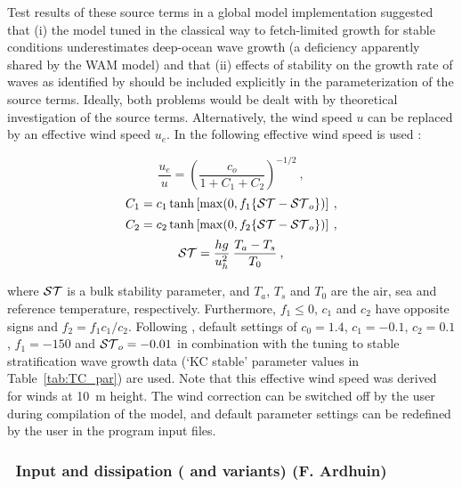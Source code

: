 Test results of these source terms in a global model implementation
\citep{tol:OMB02a} suggested that (i) the model tuned in the classical way to
fetch-limited growth for stable conditions underestimates deep-ocean wave
growth (a deficiency apparently shared by the WAM model) and that (ii) effects
of stability on the growth rate of waves as identified by
\cite{art:KC92,ibk:KC94} should be included explicitly in the parameterization
of the source terms.  Ideally, both problems would be dealt with by
theoretical investigation of the source terms. Alternatively, the wind speed
$u$ can be replaced by an effective wind speed $u_e$. In \cite{tol:OMB02a} the
following effective wind speed is used :


\begin{equation}
\frac{u_e}{u} = \left ( \frac{c_o}{1 + C_1 + C_2} \right )^{-1/2}
\: , \label{eq:scor} \end{equation} \begin{equation}
C_1 = c_1 \tanh \left [ \max ( 0 , f_1 \{ {\cal ST} - {\cal ST}_o \} ) \right ]
\: , \label{eq:c1} \end{equation} \begin{equation}
C_2 = c_2 \tanh \left [ \max ( 0 , f_2 \{ {\cal ST} - {\cal ST}_o \} ) \right ]
\: , \label{eq:c2} \end{equation} \begin{equation}
{\cal ST} = \frac{h g}{u_h^2} \: \frac{T_a - T_s}{T_0}
\: , \label{eq:stab} \end{equation}

\noindent
where ${\cal ST}$ is a bulk stability parameter, and $T_a$, $T_s$ and $T_0$ are the
air, sea and reference temperature, respectively. Furthermore, $f_1 \leq 0$,
$c_1$ and $c_2$ have opposite signs and $f_2 = f_1 c_1 / c_2$. Following
\cite{tol:OMB02a}, default settings of $c_0 = 1.4$, $c_1 = -0.1$, $c_2 = 0.1$,
$f_1 = -150$ and ${\cal ST}_o = -0.01$ in combination with the tuning to stable
stratification wave growth data (`KC stable' parameter values in
Table~\ref{tab:TC_par}) are used. Note that this effective wind speed was
derived for winds at 10~m height. The wind correction can be switched off by
the user during compilation of the model, and default parameter settings can
be redefined by the user in the program input files.

\vsssub
\subsubsection{~Input and dissipation ( and variants) \hfill {\rm (F. Ardhuin)}} \label{sec:wam4}
\vsssub

